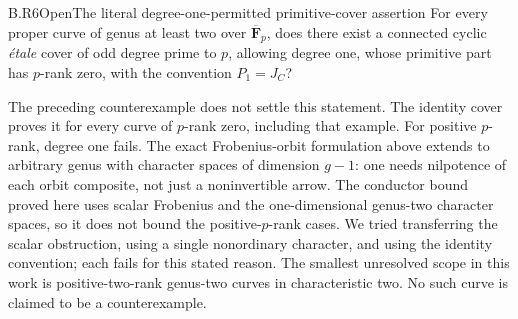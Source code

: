 \begin{claim}{B.R6}{Open}{The literal degree-one-permitted primitive-cover assertion}
For every proper curve of genus at least two over
$\overline{\mathbf F}_p$, does there exist a connected cyclic
\emph{\'etale} cover of odd degree prime to $p$, allowing degree one,
whose primitive part has $p$-rank zero, with the convention
$P_1=J_C$?
\end{claim}
The preceding counterexample does not settle this statement.
The identity cover proves it for every curve of $p$-rank zero,
including that example. For positive $p$-rank, degree one fails.
The exact Frobenius-orbit formulation above extends to arbitrary
genus with character spaces of dimension $g-1$: one needs
nilpotence of each orbit composite, not just a noninvertible
arrow. The conductor bound proved here uses scalar Frobenius
and the one-dimensional genus-two character spaces, so it does
not bound the positive-$p$-rank cases. We tried transferring the
scalar obstruction, using a single nonordinary character, and
using the identity convention; each fails for this stated reason.
The smallest unresolved scope in this work is positive-two-rank
genus-two curves in characteristic two. No such curve is claimed
to be a counterexample.


